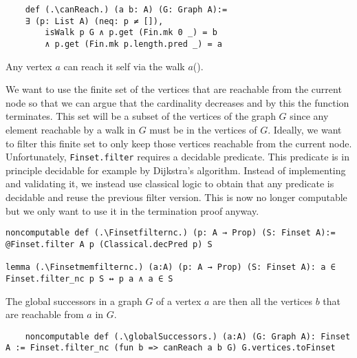 \begin{lstlisting}
    def (.\canReach.) (a b: A) (G: Graph A):= 
    ∃ (p: List A) (neq: p ≠ []), 
        isWalk p G ∧ p.get (Fin.mk 0 _) = b 
        ∧ p.get (Fin.mk p.length.pred _) = a
\end{lstlisting}

Any vertex $a$ can reach it self via the walk $a$(\canReachrefl).

We want to use the finite set of the vertices that are reachable from the current node so that we can argue that the cardinality decreases and by this the function terminates. This set will be a subset of the vertices of the graph $G$ since any element reachable by a walk in $G$ must be in the vertices of $G$. Ideally, we want to filter this finite set to only keep those vertices reachable from the current node. Unfortunately, \lstinline|Finset.filter| requires a decidable predicate. This predicate is in principle decidable for example by Dijkstra's algorithm. Instead of implementing and validating it, we instead use classical logic to obtain that any predicate is decidable and reuse the previous filter version. This is now no longer computable but we only want to use it in the termination proof anyway.

\begin{lstlisting}
noncomputable def (.\Finsetfilternc.) (p: A → Prop) (S: Finset A):= @Finset.filter A p (Classical.decPred p) S

lemma (.\Finsetmemfilternc.) (a:A) (p: A → Prop) (S: Finset A): a ∈ Finset.filter_nc p S ↔ p a ∧ a ∈ S
\end{lstlisting}

The global successors in a graph $G$ of a vertex $a$ are then all the vertices $b$ that are reachable from $a$ in $G$.

\begin{lstlisting}
    noncomputable def (.\globalSuccessors.) (a:A) (G: Graph A): Finset A := Finset.filter_nc (fun b => canReach a b G) G.vertices.toFinset
\end{lstlisting}


